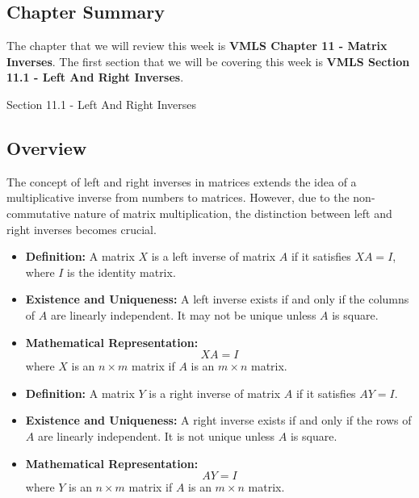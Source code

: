 \subsection{Chapter Summary}

The chapter that we will review this week is \textbf{VMLS Chapter 11 - Matrix Inverses}. The first section that we will be covering this week is \textbf{VMLS Section 11.1 - Left And Right Inverses}.

\begin{notes}{Section 11.1 - Left And Right Inverses}
    \subsection*{Overview}

    The concept of left and right inverses in matrices extends the idea of a multiplicative inverse from numbers to matrices. However, due to the non-commutative nature of matrix multiplication, the 
    distinction between left and right inverses becomes crucial. \vspace*{1em}

    \begin{highlight}
        \begin{itemize}
            \item \textbf{Definition:} A matrix $X$ is a left inverse of matrix $A$ if it satisfies $XA = I$, where $I$ is the identity matrix.
            \item \textbf{Existence and Uniqueness:} A left inverse exists if and only if the columns of $A$ are linearly independent. It may not be unique unless $A$ is square.
            \item \textbf{Mathematical Representation:}
            \begin{equation*}
                XA = I
            \end{equation*}
            where $X$ is an $n \times m$ matrix if $A$ is an $m \times n$ matrix.
        \end{itemize}
    \end{highlight}

    \begin{highlight}
        \begin{itemize}
            \item \textbf{Definition:} A matrix $Y$ is a right inverse of matrix $A$ if it satisfies $AY = I$.
            \item \textbf{Existence and Uniqueness:} A right inverse exists if and only if the rows of $A$ are linearly independent. It is not unique unless $A$ is square.
            \item \textbf{Mathematical Representation:} 
            \begin{equation*}
                AY = I
            \end{equation*}
            where $Y$ is an $n \times m$ matrix if $A$ is an $m \times n$ matrix.
        \end{itemize}
    \end{highlight}


\end{notes}
